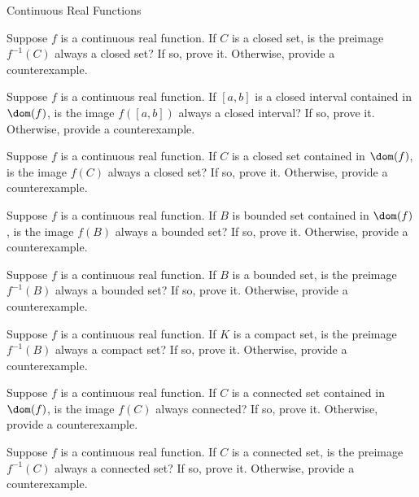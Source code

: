 \begin{section}{Continuous Real Functions}
\begin{problem}
Suppose $f$ is a continuous real function. If $C$ is a closed set, is the preimage $f^{-1}(C)$ always a closed set? If so, prove it.  Otherwise, provide a counterexample.
\end{problem}

\begin{problem}
Suppose $f$ is a continuous real function. If $[a,b]$ is a closed interval contained in $\dom(f)$, is the image $f([a,b])$ always a closed interval?  If so, prove it.  Otherwise, provide a counterexample.
\end{problem}

\begin{problem}
Suppose $f$ is a continuous real function. If $C$ is a closed set contained in $\dom(f)$, is the image $f(C)$ always a closed set?  If so, prove it.  Otherwise, provide a counterexample.
\end{problem}

\begin{problem}
Suppose $f$ is a continuous real function. If $B$ is bounded set contained in $\dom(f)$, is the image $f(B)$ always a bounded set?  If so, prove it.  Otherwise, provide a counterexample.
\end{problem}

\begin{problem}
Suppose $f$ is a continuous real function. If $B$ is a bounded set, is the preimage $f^{-1}(B)$ always a bounded set? If so, prove it.  Otherwise, provide a counterexample.
\end{problem}

\begin{problem}
Suppose $f$ is a continuous real function. If $K$ is a compact set, is the preimage $f^{-1}(B)$ always a compact set? If so, prove it.  Otherwise, provide a counterexample.
\end{problem}

\begin{problem}\label{prob:continuous image of connected set}
Suppose $f$ is a continuous real function. If $C$ is a connected set contained in $\dom(f)$, is the image $f(C)$ always connected?  If so, prove it.  Otherwise, provide a counterexample.
\end{problem}

\begin{problem}
Suppose $f$ is a continuous real function. If $C$ is a connected set, is the preimage $f^{-1}(C)$ always a connected set? If so, prove it.  Otherwise, provide a counterexample.
\end{problem}


\end{section}
